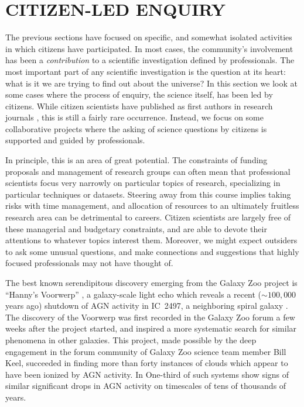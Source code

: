 \documentclass{ar2e}
\def\CaseStudy#1{\noindent{\it\bf #1 \,\,\,\,}}
\begin{document}

\section{CITIZEN-LED ENQUIRY}
\label{sec:explore}

The previous sections have focused on specific, and somewhat  isolated
activities in which citizens have participated. In most cases, the community's
involvement has been a {\it contribution} to a scientific investigation defined
by professionals. The most important part of any scientific investigation is the
question at its heart: what is it we are trying to find out about the universe?
In this section we look at some cases where the process of enquiry, the science
itself, has been led by citizens. While citizen scientists have published as
first authors in research journals \citep[see e.g.]{Hui2013,Liang2014},  this is
still a fairly rare occurrence. Instead, we focus on some collaborative projects
where the asking of science questions by citizens is supported and guided by
professionals.

In principle, this is an area of great potential. The constraints of funding
proposals and management of research groups can often mean that professional
scientists focus very narrowly on particular topics of research, specializing in
particular techniques or datasets.  Steering away from this course implies
taking risks with time management, and allocation of resources to an ultimately
fruitless research area can be detrimental to careers.  Citizen scientists are
largely free of these managerial and budgetary constraints, and are able to
devote their attentions to whatever topics interest them. Moreover, we might
expect outsiders to ask some unusual questions, and make connections and
suggestions that highly focused professionals may not have thought of. 



\CaseStudy{The Galaxy Zoo Forum.} 

The best known serendipitous discovery emerging from the Galaxy Zoo project is
``Hanny's Voorwerp'' \citep{Lintott++2009}, a galaxy-scale light echo which
reveals a recent ($\sim100,000$ years ago)  shutdown of AGN activity in IC~2497, 
a neighboring spiral galaxy \citep{Keel++2012}. 
The discovery of the Voorwerp was first
recorded in the Galaxy Zoo forum a few weeks after the project started, and
inspired a more systematic search for similar phenomena in other galaxies. This
project, made possible by the deep engagement in the forum community of Galaxy
Zoo science team member Bill Keel, succeeded in finding more than forty
instances of clouds which appear to have been ionized by AGN activity. In
One-third of such systems show signs of similar significant drops in AGN activity on
timescales of tens of thousands of years.  
\end{document}
